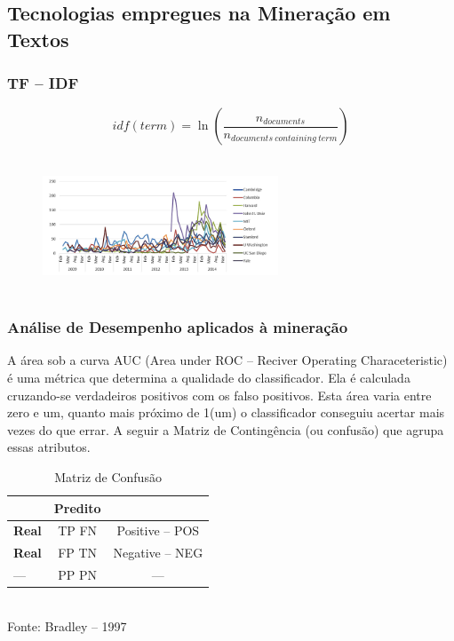 \documentclass[11pt]{beamer}
\begin{document}

\subsection{ Tecnologias empregues na Mineração em Textos}

\begin{frame}\frametitle{ TF -- IDF}
	\transdissolve[duration=1, direction=25]
	\begin{equation}
		idf(term) = \ln(\frac{n_{documents}}{n_{documents\  containing \ term}})
	\end{equation}
	\pause
	\begin{figure}[!ht]
	 		\includegraphics[width=70mm, height=40mm]{Figuras/BigData/ferqPalavrasG.png}
	\end{figure}
\end{frame}

\begin{frame}\frametitle{ Análise de Desempenho aplicados à mineração}

	A área sob a curva AUC (Area under ROC -- Reciver Operating Characeteristic) é uma métrica que determina a qualidade do classificador.
	Ela é calculada cruzando-se verdadeiros positivos com os falso positivos. 
	Esta área varia entre zero e um, quanto mais próximo de 1(um) o classificador conseguiu acertar mais vezes do que errar.
	A seguir a Matriz de Contingência (ou confusão) que agrupa essas atributos.
	\begin{table}[ht]
		\centering
		\caption{Matriz de Confusão}
		\vspace{1mm}
		\begin{tabular}{l|c|c}
			\hline
			\textbf{} & \textbf{Predito} & \textbf{}\\
			\hline
			\textbf{Real}  & TP   FN & Positive -- POS\\
			\textbf{Real}  & FP   TN & Negative -- NEG\\
			\hline
			---         & PP   PN &    ---         \\
		\end{tabular}
		\\
		\tiny Fonte: Bradley -- 1997
	\end{table}
\end{frame}
\end{document}
